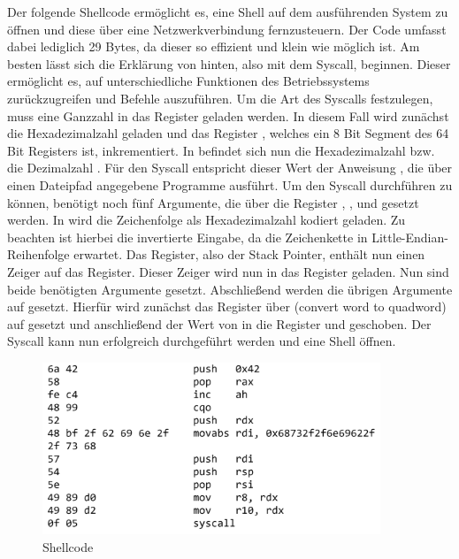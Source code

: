 Der folgende Shellcode ermöglicht es, eine Shell auf dem ausführenden System zu öffnen und diese über eine Netzwerkverbindung fernzusteuern. 
Der Code umfasst dabei lediglich 29 Bytes, da dieser so effizient und klein wie möglich ist. 
Am besten lässt sich die Erklärung von hinten, also mit dem Syscall, beginnen.
Dieser ermöglicht es, auf unterschiedliche Funktionen des Betriebssystems zurückzugreifen und Befehle auszuführen. 
Um die Art des Syscalls festzulegen, muss eine Ganzzahl in das Register  geladen werden. 
In diesem Fall wird zunächst die Hexadezimalzahl  geladen und das Register , 
welches ein 8 Bit Segment des 64 Bit  Registers ist, inkrementiert. 
In  befindet sich nun die Hexadezimalzahl  bzw. die Dezimalzahl . 
Für den Syscall entspricht dieser Wert der Anweisung , 
die über einen Dateipfad angegebene Programme ausführt. Um den Syscall durchführen zu können, benötigt  noch fünf Argumente, 
die über die Register , ,  und  gesetzt werden. 
In  wird die Zeichenfolge  als Hexadezimalzahl kodiert geladen. 
Zu beachten ist hierbei die invertierte Eingabe, da  die Zeichenkette in Little-Endian-Reihenfolge erwartet. Das  Register, 
also der Stack Pointer, 
enthält nun einen Zeiger auf das  Register. Dieser Zeiger wird nun in das  Register geladen. Nun sind beide benötigten Argumente gesetzt. 
Abschließend werden die übrigen Argumente auf  gesetzt. Hierfür wird zunächst das  Register 
über  (convert word to quadword) auf  gesetzt und
anschließend der Wert von  in die Register  und  geschoben. 
Der Syscall kann nun erfolgreich durchgeführt werden und eine Shell öffnen. \cite{syscalls} \cite{execman}
\pagebreak

\begin{figure}[h]
    \centering
    \includegraphics[width=0.9\textwidth,height=0.75\textheight,keepaspectratio]{images/shellstorm.png}
    \caption{Shellcode}
\end{figure}
\cite{shellstorm}

